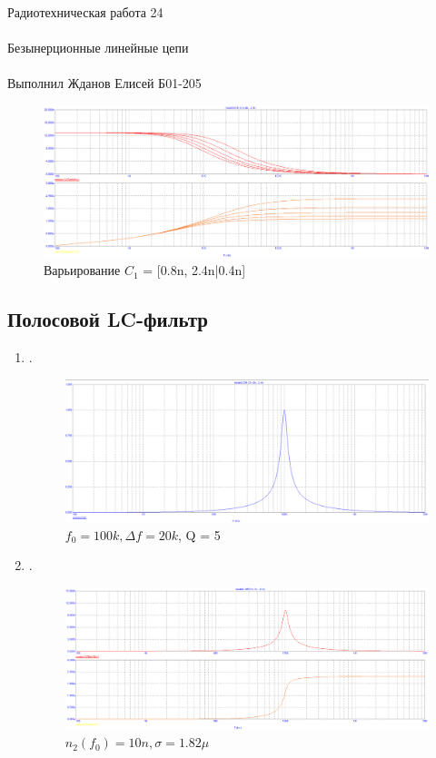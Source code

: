 \documentclass{astroedu-lab}
\begin{document}
\begin{problem}{\huge Радиотехническая работа 24\\\\Безынерционные линейные цепи\\\\Выполнил Жданов Елисей Б01-205}
\begin{enumerate}
\begin{figure}[h!]
    \centering
    \includegraphics[scale=0.3]{images/mod3_1_4.png}
    \caption{Варьирование $C_1$ = [0.8n, 2.4n|0.4n]}
    \label{fig:m314}
\end{figure}


\end{enumerate}

\subsection*{Полосовой LC-фильтр}

\begin{enumerate}

\item

.

\begin{figure}[h!]
    \centering
    \includegraphics[scale=0.3]{images/mod3_2_1.png}
    \caption{$f_0 = 100k, \Delta f = 20k$, Q = 5}
    \label{fig:m321}
\end{figure}


\item

.

\begin{figure}[h!]
    \centering
    \includegraphics[scale=0.3]{images/mod3_2_2.png}
    \caption{$n_2(f_0) = 10n, \sigma = 1.82\mu$}
    \label{fig:m322}
\end{figure}


\end{enumerate}
\end{problem}
\end{document}
